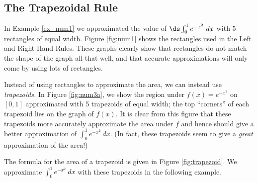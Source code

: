\subsection*{The Trapezoidal Rule}

In Example \ref{ex_num1} we approximated the value of $\ds \int_0^1 e^{-x^2}\ dx$ with 5 rectangles of equal width. Figure \ref{fig:num1} shows the rectangles used in the Left and Right Hand Rules. These graphs clearly show that rectangles do not match the shape of the graph all that well, and that accurate approximations will only come by using lots of rectangles. 

Instead of using rectangles to approximate the area, we can instead use \textit{trapezoids.} In Figure \ref{fig:num3a}, we show the region under $f(x) = e^{-x^2}$ on $[0,1]$ approximated with 5 trapezoids of equal width; the top ``corners'' of each trapezoid lies on the graph of $f(x)$. It is clear from this figure that these trapezoids more accurately approximate the area under $f$ and hence should give a better approximation of $\int_0^1 e^{-x^2}\ dx$. (In fact, these trapezoids seem to give a \textit{great} approximation of the area!)


The formula for the area of a trapezoid is given in Figure \ref{fig:trapezoid}. We approximate $\int_0^1 e^{-x^2}\ dx$ with these trapezoids in the following example.\\

